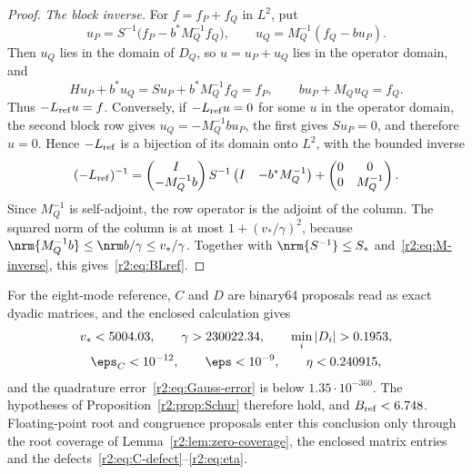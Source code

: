 \begin{proof}
\emph{The block inverse.}
For $f=f_P+f_Q$ in $L^2$, put
\[
 u_P=S^{-1}\bigl(f_P-b^*M_Q^{-1}f_Q\bigr),\qquad
 u_Q=M_Q^{-1}(f_Q-bu_P).
\]
Then $u_Q$ lies in the domain of $D_Q$, so $u=u_P+u_Q$ lies in the operator domain, and
\[
 Hu_P+b^*u_Q=Su_P+b^*M_Q^{-1}f_Q=f_P,\qquad bu_P+M_Qu_Q=f_Q.
\]
Thus $-L_{\rm ref}u=f$. Conversely, if $-L_{\rm ref}u=0$ for some $u$ in the operator domain, the second block row gives $u_Q=-M_Q^{-1}bu_P$, the first gives $Su_P=0$, and therefore $u=0$. Hence $-L_{\rm ref}$ is a bijection of its domain onto $L^2$, with the bounded inverse
\[
 (-L_{\rm ref})^{-1}
 =\begin{pmatrix}I\\-M_Q^{-1}b\end{pmatrix}
 S^{-1}\begin{pmatrix}I&-b^*M_Q^{-1}\end{pmatrix}
 +\begin{pmatrix}0&0\\0&M_Q^{-1}\end{pmatrix}.
\]
Since $M_Q^{-1}$ is self-adjoint, the row operator is the adjoint of the column. The squared norm of the column is at most $1+(v_*/\gamma)^2$, because $\nrm{M_Q^{-1}b}\le\nrm b/\gamma\le v_*/\gamma$. Together with $\nrm{S^{-1}}\le S_*$ and~\eqref{r2:eq:M-inverse}, this gives~\eqref{r2:eq:BLref}.
\end{proof}

For the eight-mode reference, $C$ and $D$ are binary64 proposals read as exact dyadic matrices, and the enclosed calculation gives
\begin{equation}\label{r2:eq:spectral-numbers}
 \begin{gathered}
 v_*<5004.03,\qquad\gamma>230022.34,\qquad\min_i|D_i|>0.1953,\\
 \eps_C<10^{-12},\qquad\eps<10^{-9},\qquad\eta<0.240915,
 \end{gathered}
\end{equation}
and the quadrature error~\eqref{r2:eq:Gauss-error} is below $1.35\cdot10^{-360}$. The hypotheses of Proposition~\ref{r2:prop:Schur} therefore hold, and $B_{\rm ref}<6.748$. Floating-point root and congruence proposals enter this conclusion only through the root coverage of Lemma~\ref{r2:lem:zero-coverage}, the enclosed matrix entries and the defects~\eqref{r2:eq:C-defect}--\eqref{r2:eq:eta}.

